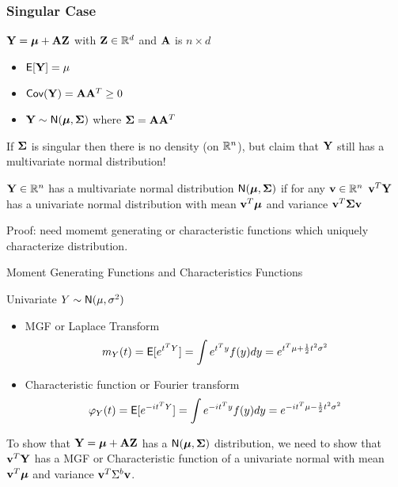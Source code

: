 \documentclass[handout]{beamer}
\begin{document}
\begin{frame} \frametitle{Singular Case}
$\mathbf{Y} = \boldsymbol{\mu} + \mathbf{A} \mathbf{Z}$  with $\mathbf{Z} \in \mathbb{R}^d$ and $\mathbf{A}$ is $n \times d$ \pause
\begin{itemize}
\item $\textsf{E}[\mathbf{Y}] = \mu$ \pause
\item $\textsf{Cov}(\mathbf{Y}) = \mathbf{A} \mathbf{A}^T \ge 0$ \pause
\item $\mathbf{Y} \sim \textsf{N}(\boldsymbol{\mu}, \boldsymbol{\Sigma})$ where $\boldsymbol{\Sigma} = \mathbf{A} \mathbf{A}^T$
\end{itemize}
  If $\boldsymbol{\Sigma}$ is singular then there is no density (on $\mathbb{R}^n$), but claim that
  $\mathbf{Y}$ still has a multivariate normal distribution!  \pause

 \begin{definition}
  $\mathbf{Y} \in \mathbb{R}^n$ has a  multivariate normal distribution $\textsf{N}(\boldsymbol{\mu},
  \boldsymbol{\Sigma})$ if for any $\mathbf{v} \in \mathbb{R}^n$ $\mathbf{v}^T\mathbf{Y}$ has a univariate normal
  distribution with mean $\mathbf{v}^T\boldsymbol{\mu}$ and variance $\mathbf{v}^T\boldsymbol{\Sigma} \mathbf{v}$
  \end{definition} \pause

Proof:  need momemt generating or characteristic functions which uniquely characterize distribution.
\end{frame}

\begin{frame}{Moment Generating Functions and Characteristics Functions}


Univariate $Y \sim \textsf{N}(\mu, \sigma^2)$
\begin{itemize}
  \item MGF or Laplace Transform
  $$m_{Y}(t) = \textsf{E}[e^{t^TY}]   = \int e^{t^Ty} f(y)  dy
= e^{t^T\mu + \frac{1}{2} t^2 \sigma^2 }
  $$

  \item Characteristic function or Fourier transform
  $$\varphi_{Y}(t) = \textsf{E}[e^{-i t^TY}]
  = \int e^{ -i t^Ty} f(y)  dy
= e^{-i t^T\mu  - \frac{1}{2} t^2 \sigma^2 }
  $$
\end{itemize}

To show that $\mathbf{Y} = \boldsymbol{\mu} + \mathbf{A} \mathbf{Z}$ has a $\textsf{N}(\boldsymbol{\mu}, \boldsymbol{\Sigma})$ distribution, we need to show that
$\mathbf{v}^T\mathbf{Y}$ has a MGF or Characteristic function of a univariate normal with mean $\mathbf{v}^T\boldsymbol{\mu}$ and variance $\mathbf{v}^T\Sigma^b\mathbf{v}$.
\end{frame}
\end{document}
